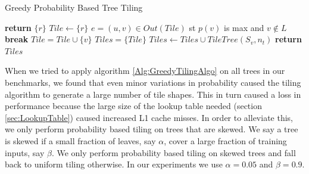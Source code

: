 
\begin{algorithm}
    \caption{Greedy Probability Based Tree Tiling}
    \label{Alg:GreedyTilingAlgo}
    \begin{algorithmic}
                \State \textbf{return} $\{ r \}$
            \EndIf
            \State $Tile \leftarrow \{ r \}$
                \State $e = (u,v) \in Out(Tile)$ st $p(v)$ is max and $v \notin L$
                    \State \textbf{break}
                \EndIf
                \State $Tile = Tile \cup \{ v \}$
            \EndWhile
            \State $Tiles =  \{ Tile \}$
                \State $Tiles \leftarrow Tiles \cup TileTree(S_v, n_t)$
            \EndFor
            \State \textbf{return} $Tiles$
        \EndProcedure
    \end{algorithmic}
\end{algorithm}

When we tried to apply algorithm \ref{Alg:GreedyTilingAlgo} on all trees in our benchmarks, we found
that even minor variations in probability caused the tiling algorithm to generate a large 
number of tile shapes. This in turn caused a loss in performance because the large size of the 
lookup table needed (section \ref{sec:LookupTable}) caused increased L1 cache misses. In order to 
alleviate this, we only perform probability based tiling on trees that are skewed. We say a tree is
skewed if a small fraction of leaves, say $\alpha$, cover a large fraction of training inputs, say $\beta$.
We only perform probability based tiling on skewed trees and fall back to uniform tiling otherwise. 
In our experiments we use $\alpha=0.05$ and $\beta=0.9$. 

